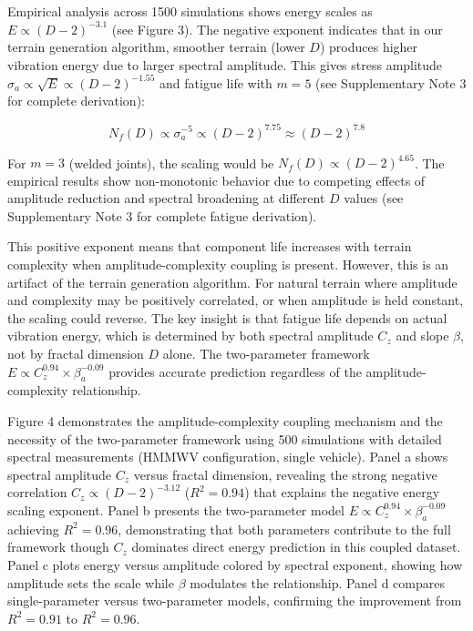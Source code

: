 \documentclass[11pt]{article}
\begin{document}
Empirical analysis across 1500 simulations shows energy scales as $E \propto (D-2)^{-3.1}$ (see Figure 3). The negative exponent indicates that in our terrain generation algorithm, smoother terrain (lower $D$) produces higher vibration energy due to larger spectral amplitude. This gives stress amplitude $\sigma_a \propto \sqrt{E} \propto (D-2)^{-1.55}$ and fatigue life with $m=5$ (see Supplementary Note 3 for complete derivation):

\begin{equation}
N_f(D) \propto \sigma_a^{-5} \propto (D-2)^{7.75} \approx (D-2)^{7.8}
\end{equation}

For $m=3$ (welded joints), the scaling would be $N_f(D) \propto (D-2)^{4.65}$. The empirical results show non-monotonic behavior due to competing effects of amplitude reduction and spectral broadening at different $D$ values (see Supplementary Note 3 for complete fatigue derivation).

This positive exponent means that component life increases with terrain complexity when amplitude-complexity coupling is present. However, this is an artifact of the terrain generation algorithm. For natural terrain where amplitude and complexity may be positively correlated, or when amplitude is held constant, the scaling could reverse. The key insight is that fatigue life depends on actual vibration energy, which is determined by both spectral amplitude $C_z$ and slope $\beta$, not by fractal dimension $D$ alone. The two-parameter framework $E \propto C_z^{0.94} \times \beta_a^{-0.09}$ provides accurate prediction regardless of the amplitude-complexity relationship.


Figure 4 demonstrates the amplitude-complexity coupling mechanism and the necessity of the two-parameter framework using 500 simulations with detailed spectral measurements (HMMWV configuration, single vehicle). Panel a shows spectral amplitude $C_z$ versus fractal dimension, revealing the strong negative correlation $C_z \propto (D-2)^{-3.12}$ ($R^2 = 0.94$) that explains the negative energy scaling exponent. Panel b presents the two-parameter model $E \propto C_z^{0.94} \times \beta_a^{-0.09}$ achieving $R^2 = 0.96$, demonstrating that both parameters contribute to the full framework though $C_z$ dominates direct energy prediction in this coupled dataset. Panel c plots energy versus amplitude colored by spectral exponent, showing how amplitude sets the scale while $\beta$ modulates the relationship. Panel d compares single-parameter versus two-parameter models, confirming the improvement from $R^2 = 0.91$ to $R^2 = 0.96$.
\end{document}
